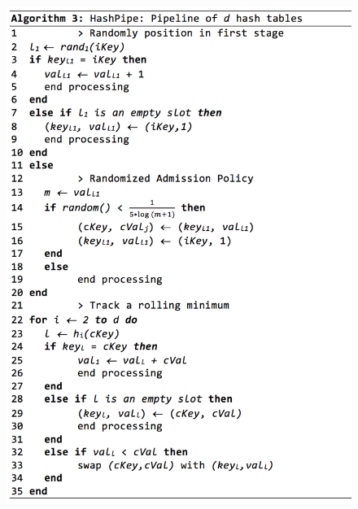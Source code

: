 \begin{figure}[t]
  \centering
    \includegraphics[scale=0.5]{alg3}
     \label{fig:bp-image}
\end{figure}



